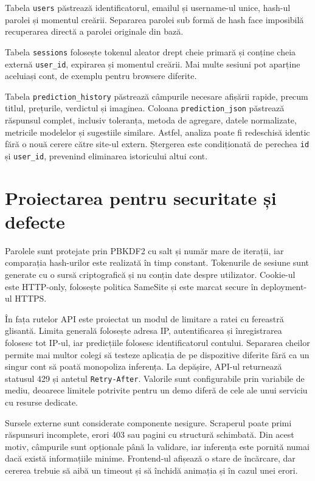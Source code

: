 Tabela \texttt{users} păstrează identificatorul, emailul și username-ul unice, hash-ul parolei și momentul creării. Separarea parolei sub formă de hash face imposibilă recuperarea directă a parolei originale din bază.

Tabela \texttt{sessions} folosește tokenul aleator drept cheie primară și conține cheia externă \texttt{user\_id}, expirarea și momentul creării. Mai multe sesiuni pot aparține aceluiași cont, de exemplu pentru browsere diferite.

Tabela \texttt{prediction\_history} păstrează câmpurile necesare afișării rapide, precum titlul, prețurile, verdictul și imaginea. Coloana \texttt{prediction\_json} păstrează răspunsul complet, inclusiv toleranța, metoda de agregare, datele normalizate, metricile modelelor și sugestiile similare. Astfel, analiza poate fi redeschisă identic fără o nouă cerere către site-ul extern. Ștergerea este condiționată de perechea \texttt{id} și \texttt{user\_id}, prevenind eliminarea istoricului altui cont.

\section{Proiectarea pentru securitate și defecte}
\label{sec:app-security-design}

Parolele sunt protejate prin PBKDF2 cu salt și număr mare de iterații, iar comparația hash-urilor este realizată în timp constant. Tokenurile de sesiune sunt generate cu o sursă criptografică și nu conțin date despre utilizator. Cookie-ul este HTTP-only, folosește politica SameSite și este marcat secure în deployment-ul HTTPS.

În fața rutelor API este proiectat un modul de limitare a ratei cu fereastră glisantă. Limita generală folosește adresa IP, autentificarea și înregistrarea folosesc tot IP-ul, iar predicțiile folosesc identificatorul contului. Separarea cheilor permite mai multor colegi să testeze aplicația de pe dispozitive diferite fără ca un singur cont să poată monopoliza inferența. La depășire, API-ul returnează statusul 429 și antetul \texttt{Retry-After}. Valorile sunt configurabile prin variabile de mediu, deoarece limitele potrivite pentru un demo diferă de cele ale unui serviciu cu resurse dedicate.

Sursele externe sunt considerate componente nesigure. Scraperul poate primi răspunsuri incomplete, erori 403 sau pagini cu structură schimbată. Din acest motiv, câmpurile sunt opționale până la validare, iar inferența este pornită numai dacă există informațiile minime. Frontend-ul afișează o stare de încărcare, dar cererea trebuie să aibă un timeout și să închidă animația și în cazul unei erori.

